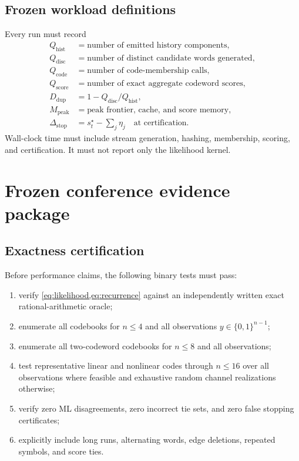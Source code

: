 \documentclass[11pt]{article}
\theoremstyle{definition}
\theoremstyle{remark}
\begin{document}
\subsection{Frozen workload definitions}

Every run must record
\begin{align*}
Q_{\mathrm{hist}}&=\text{number of emitted history components},\\
Q_{\mathrm{disc}}&=\text{number of distinct candidate words generated},\\
Q_{\mathrm{code}}&=\text{number of code-membership calls},\\
Q_{\mathrm{score}}&=\text{number of exact aggregate codeword scores},\\
D_{\mathrm{dup}}&=1-Q_{\mathrm{disc}}/Q_{\mathrm{hist}},\\
M_{\mathrm{peak}}&=\text{peak frontier, cache, and score memory},\\
\Delta_{\mathrm{stop}}&=s_t^\star-\sum_j\eta_j\quad\text{at certification}.
\end{align*}
Wall-clock time must include stream generation, hashing, membership, scoring, and certification. It must not report only the likelihood kernel.

\section{Frozen conference evidence package}

\subsection{Exactness certification}

Before performance claims, the following binary tests must pass:

\begin{enumerate}
  \item verify \cref{eq:likelihood,eq:recurrence} against an independently written exact rational-arithmetic oracle;
  \item enumerate all codebooks for $n\le4$ and all observations $y\in\{0,1\}^{n-1}$;
  \item enumerate all two-codeword codebooks for $n\le8$ and all observations;
  \item test representative linear and nonlinear codes through $n\le16$ over all observations where feasible and exhaustive random channel realizations otherwise;
  \item verify zero ML disagreements, zero incorrect tie sets, and zero false stopping certificates;
  \item explicitly include long runs, alternating words, edge deletions, repeated symbols, and score ties.
\end{enumerate}
\end{document}
